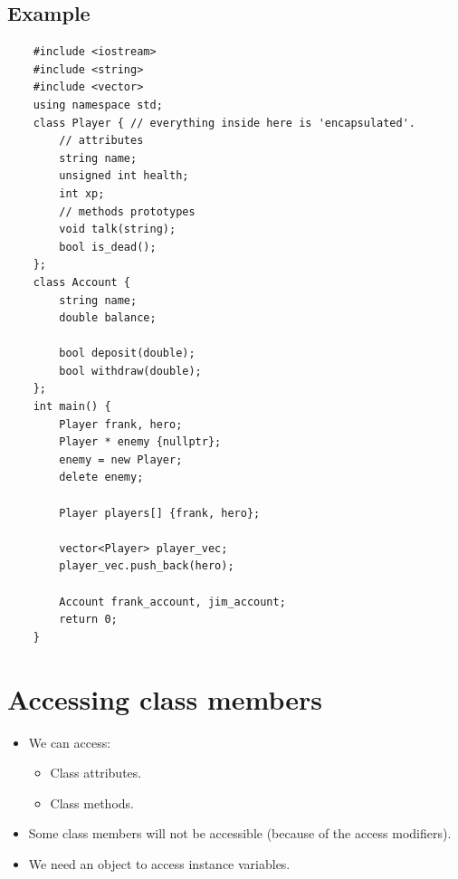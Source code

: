 \subsection{Example}
\begin{verbatim}
    #include <iostream>
    #include <string>
    #include <vector>
    using namespace std;
    class Player { // everything inside here is 'encapsulated'.
        // attributes 
        string name;
        unsigned int health;
        int xp;
        // methods prototypes
        void talk(string);
        bool is_dead();
    };
    class Account {
        string name;
        double balance;
        
        bool deposit(double);
        bool withdraw(double);
    };
    int main() {
        Player frank, hero;
        Player * enemy {nullptr};
        enemy = new Player;
        delete enemy;

        Player players[] {frank, hero};

        vector<Player> player_vec;
        player_vec.push_back(hero);

        Account frank_account, jim_account;
        return 0;
    }
\end{verbatim}

\section{Accessing class members}
\begin{itemize}
    \item We can access:
        \begin{itemize}
            \item Class attributes.
            \item Class methods.
        \end{itemize}
    
    \item Some class members will not be accessible (because of the access modifiers).
    \item We need an object to access instance variables.
\end{itemize}

